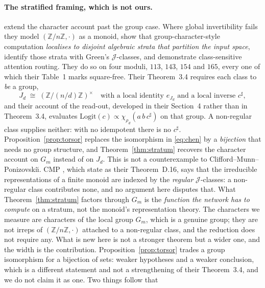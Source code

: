 \paragraph{The stratified framing, which is not ours.}
\citet{chen2026multiplication} extend the character account past the group case. Where global
invertibility fails they model $(\mathbb{Z}/n\mathbb{Z}, \cdot)$ as a monoid, show that
group-character-style computation \emph{localises to disjoint algebraic strata that partition
the input space}, identify those strata with Green's $\mathcal{J}$-classes, and demonstrate
class-sensitive attention routing. They do so on four moduli, $113$, $143$, $154$ and $165$,
every one of which their Table~1 marks square-free. Their Theorem~3.4 requires each class to \emph{be} a group,
\begin{equation}
  \label{eq:chen}
  J_{d} \;\cong\; (\mathbb{Z}/(n/d)\mathbb{Z})^{\times}
  \quad\text{with a local identity } e_{J_{d}} \text{ and a local inverse } c^{\sharp},
\end{equation}
and their account of the read-out, developed in their Section~4 rather than in
Theorem~3.4, evaluates $\mathrm{Logit}(c) \propto \chi_{\rho_{d}}(a\,b\,c^{\sharp})$ on that
group. A non-regular class supplies neither: with no idempotent there is no $c^{\sharp}$.
Proposition~\ref{prop:torsor} replaces the isomorphism in \eqref{eq:chen} by a
\emph{bijection} that needs no group structure, and Theorem~\ref{thm:stratum} recovers the
character account on $G_{m}$ instead of on $J_{d}$. This is not a counterexample to Clifford--Munn--Ponizovski\u{\i}. CMP
\citep{steinberg2016monoids}, which \citet{chen2026multiplication} state as their
Theorem~D.16, says that the irreducible representations of a finite monoid are indexed by the
\emph{regular} $\mathcal{J}$-classes: a non-regular class contributes none, and no argument
here disputes that. What Theorem~\ref{thm:stratum} factors through $G_{m}$ is the
\emph{function the network has to compute} on a stratum, not the monoid's representation
theory. The characters we measure are characters of the local group $G_{m}$, which is a
genuine group; they are not irreps of $(\mathbb{Z}/n\mathbb{Z}, \cdot)$ attached to a
non-regular class, and the reduction does not require any. What is new here is not a stronger theorem but a wider one, and the width is the
contribution. Proposition~\ref{prop:torsor} trades a group isomorphism for a bijection of
sets: weaker hypotheses and a weaker conclusion, which is a different statement and not a
strengthening of their Theorem~3.4, and we do not claim it as one. Two things follow that
